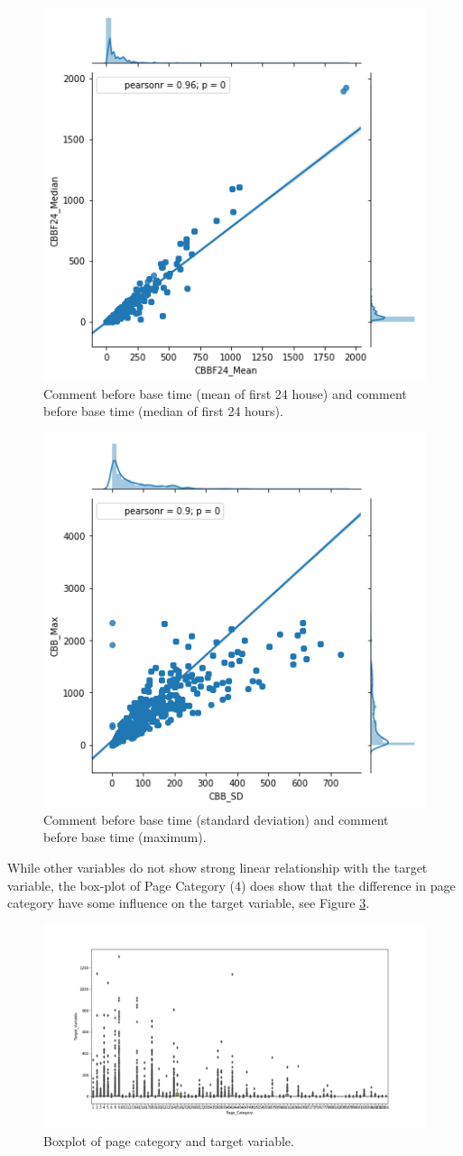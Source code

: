 \documentclass[]{article}
\begin{document}
%
%
\begin{figure}[hbtp]
	\centering
	\includegraphics[width=.5\columnwidth]{../Figures/jointplot2}
	\caption{Comment before base time (mean of first 24 house) and comment before base time (median of first 24 hours).}
	\label{fig:jointplot2}
\end{figure}
%
%
\begin{figure}[hbtp]
	\centering
	\includegraphics[width=.5\columnwidth]{../Figures/jointplot3}
	\caption{Comment before base time (standard deviation) and comment before base time (maximum).}
	\label{fig:jointplot3}
\end{figure}
%

While other variables do not show strong linear relationship with the target variable, the box-plot of Page Category (4) does show that the difference in page category have some influence on the target variable, see Figure \ref{fig:boxplot1}.
%
\begin{figure}[hbtp]
	\centering
	\includegraphics[width=1\columnwidth]{../Figures/box_page_cat}
	\caption{Boxplot of page category and target variable.}
	\label{fig:boxplot1}
\end{figure}
%
\end{document}
